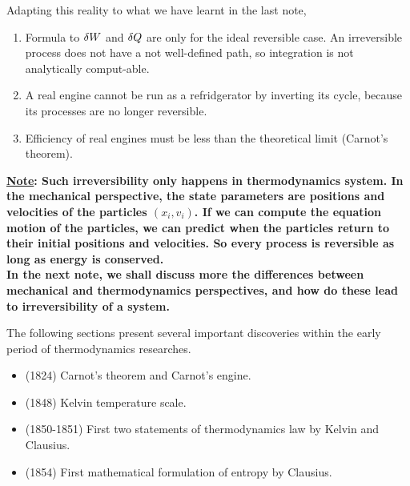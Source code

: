 \documentclass[class=article, crop=false, 12pt]{standalone}
\begin{document}
Adapting this reality to what we have learnt in the last note,
\begin{enumerate}
    \item Formula to $\var{W}$ and $\var{Q}$ are only for the ideal reversible case. 
    An irreversible process does not have a not well-defined path, so integration is not analytically comput-able.

    \item A real engine cannot be run as a refridgerator by inverting its cycle, 
    because its processes are no longer reversible.

    \item Efficiency of real engines must be less than the theoretical limit (Carnot's theorem).
    
    
    
\end{enumerate}


\bf{\ul{Note}}: Such irreversibility only happens in thermodynamics system.
In the mechanical perspective, 
the state parameters are positions and velocities of the particles $(x_i, v_i)$.
If we can compute
the equation motion of the particles,
we can predict when the particles return to their initial positions and velocities. 
So every process is reversible as long as energy is conserved.\\

In the next note, we shall discuss more the differences between mechanical and thermodynamics perspectives,
and how do these lead to irreversibility of a system.



\linesep

The following sections present several important discoveries within the early period of thermodynamics researches.
\begin{itemize}
    \item (1824) Carnot's theorem and Carnot's engine.
    \item (1848) Kelvin temperature scale.
    \item (1850-1851) First two statements of thermodynamics  law by Kelvin and Clausius.
    \item (1854) First mathematical formulation of entropy by Clausius.
\end{itemize}
\end{document}
